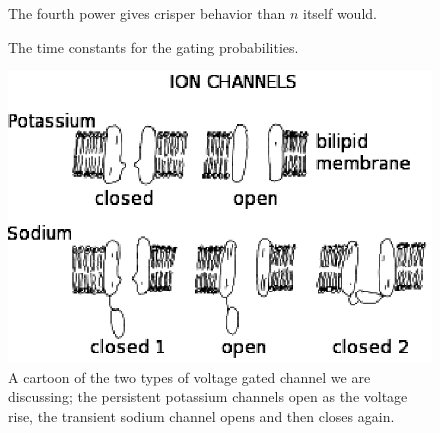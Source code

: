 \documentclass{article}
\begin{document}
\begin{figure}
\begin{center}

\end{center}
\caption{The fourth power gives crisper behavior than $n$ itself would.\label{fig:nfour}}
\end{figure}


\begin{figure}
\begin{center}

\end{center}
\caption{The time constants for the gating probabilities.\label{fig:tau_vals}}
\end{figure}


\begin{figure}
\begin{center}
\includegraphics{ChannelsBlack.eps}
\end{center}
\caption{A cartoon of the two types of voltage gated channel we are
  discussing; the persistent potassium channels open as the voltage
  rise, the transient sodium channel opens and then closes
  again.\label{ChannelsBlack}}
\end{figure}
\end{document}
